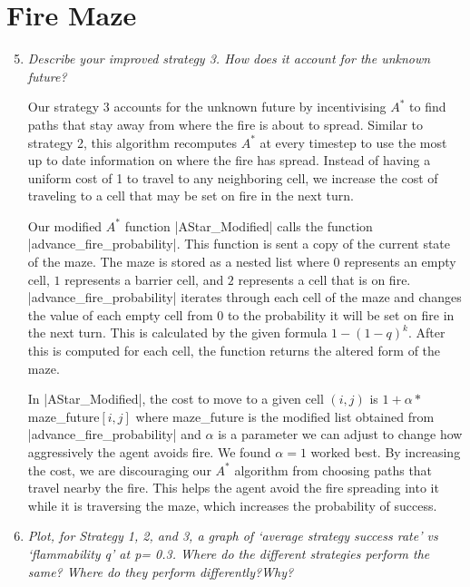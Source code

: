 \documentclass[12pt, twoside]{article}
\begin{document}
\section{Fire Maze}
\begin{enumerate}
    \setcounter{enumi}{4}
    \item \textit{Describe your improved strategy 3. How does it account for the unknown future?}

        \vspace{4mm}
    
    Our strategy 3 accounts for the unknown future by incentivising $A^*$ to find paths that stay away from where the fire is about to spread. Similar to strategy 2, this algorithm recomputes $A^*$ at every timestep to use the most up to date information on where the fire has spread. Instead of having a uniform cost of 1 to travel to any neighboring cell, we increase the cost of traveling to a cell that may be set on fire in the next turn.
    
    \vspace{4mm}
    Our modified $A^*$ function \cverb|AStar_Modified| calls the function \cverb|advance_fire_probability|. This function is sent a copy of the current state of the maze. The maze is stored as a nested list where $0$ represents an empty cell, $1$ represents a barrier cell, and $2$ represents a cell that is on fire. \cverb|advance_fire_probability| iterates through each cell of the maze and changes the value of each empty cell from 0 to the probability it will be set on fire in the next turn. This is calculated by the given formula $1-(1-q)^k$. After this is computed for each cell, the function returns the altered form of the maze.
    
    \vspace{4mm}
    In \cverb|AStar_Modified|, the cost to move to a given cell $(i,j)$ is $1+\alpha *$ maze\_future$[i,j]$ where maze\_future is the modified list obtained from \cverb|advance_fire_probability| and $\alpha$ is a parameter we can adjust to change how aggressively the agent avoids fire. We found $\alpha = 1$ worked best. By increasing the cost, we are discouraging our $A^*$ algorithm from choosing paths that travel nearby the fire. This helps the agent avoid the fire spreading into it while it is traversing the maze, which increases the probability of success.
    
    \item \textit{Plot,  for  Strategy  1,  2,  and  3,  a  graph  of  ‘average  strategy  success  rate’  vs  ‘flammability q’ at p= 0.3.  Where do the different strategies perform the same?  Where do they perform differently?Why?}
    

\end{enumerate}
\end{document}
